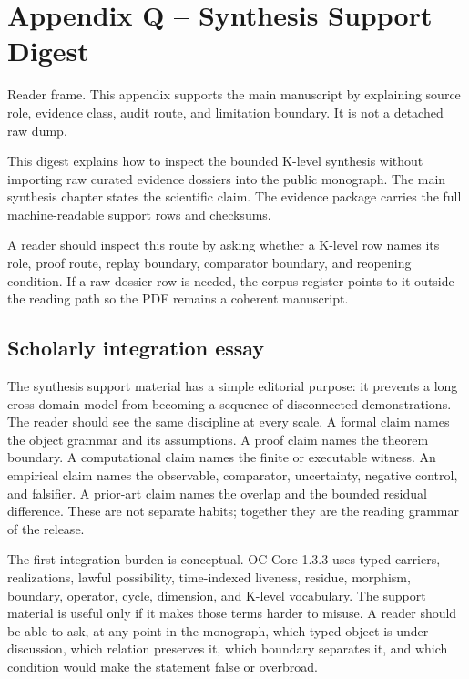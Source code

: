 \section{Appendix Q -- Synthesis Support Digest}
Reader frame. This appendix supports the main manuscript by explaining source role, evidence class, audit route, and limitation boundary. It is not a detached raw dump.


\label{sec:oc-core-1-3-synthesis-support-dossiers}

This digest explains how to inspect the bounded K-level synthesis without importing raw curated evidence dossiers into the public monograph. The main synthesis chapter states the scientific claim. The evidence package carries the full machine-readable support rows and checksums.


A reader should inspect this route by asking whether a K-level row names its role, proof route, replay boundary, comparator boundary, and reopening condition. If a raw dossier row is needed, the corpus register points to it outside the reading path so the PDF remains a coherent manuscript.


\subsection{Scholarly integration essay}

The synthesis support material has a simple editorial purpose: it prevents a long cross-domain model from becoming a sequence of disconnected demonstrations. The reader should see the same discipline at every scale. A formal claim names the object grammar and its assumptions. A proof claim names the theorem boundary. A computational claim names the finite or executable witness. An empirical claim names the observable, comparator, uncertainty, negative control, and falsifier. A prior-art claim names the overlap and the bounded residual difference. These are not separate habits; together they are the reading grammar of the release.


The first integration burden is conceptual. OC Core 1.3.3 uses typed carriers, realizations, lawful possibility, time-indexed liveness, residue, morphism, boundary, operator, cycle, dimension, and K-level vocabulary. The support material is useful only if it makes those terms harder to misuse. A reader should be able to ask, at any point in the monograph, which typed object is under discussion, which relation preserves it, which boundary separates it, and which condition would make the statement false or overbroad.


